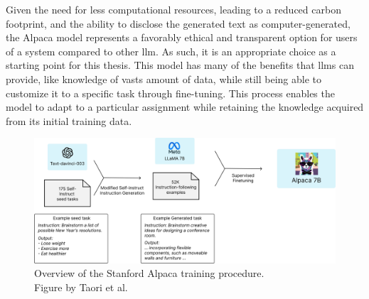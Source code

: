     Given the need for less computational resources, leading to a reduced carbon footprint, and the ability to disclose the generated text as computer-generated, the Alpaca model represents a favorably ethical and transparent option for users of a system compared to other \gls{llm}. As such, it is an appropriate choice as a starting point for this thesis. This model has many of the benefits that \glspl{llm} can provide, like knowledge of vasts amount of data, while still being able to customize it to a specific task through fine-tuning. This process enables the model to adapt to a particular assignment while retaining the knowledge acquired from its initial training data.

    
    \begin{figure}[htb]
        \centerline{
        \includegraphics[width=17cm]{images/alpaca_framework.jpeg}}
        \caption[Overview of the Stanford Alpaca training procedure.]{Overview of the Stanford Alpaca training procedure.\\Figure by Taori et al. \cite{taoriStanfordCRFM}}
        \label{fig:alpaca_training}
    \end{figure}